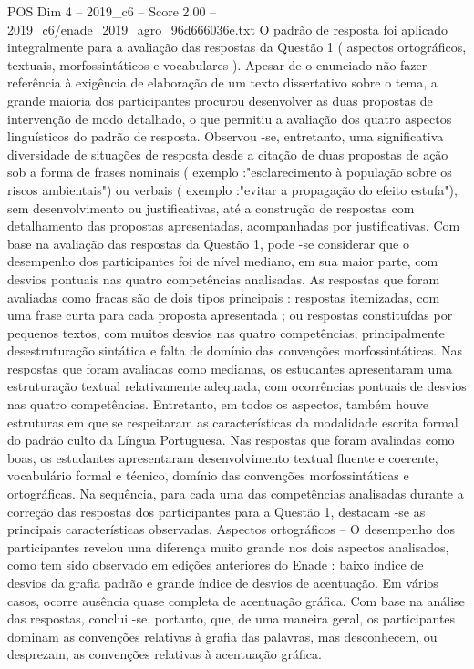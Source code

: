 \begin{textsample}{POS Dim 4 – 2019\_c6 – Score 2.00 – 2019\_c6/enade\_2019\_agro\_96d666036e.txt}
O padrão de resposta foi aplicado integralmente para a avaliação das respostas da Questão 1 ( aspectos ortográficos, textuais, morfossintáticos e vocabulares ).
Apesar de o enunciado não fazer referência à exigência de elaboração de um texto dissertativo sobre o tema, a grande maioria dos participantes procurou desenvolver as duas propostas de intervenção de modo detalhado, o que permitiu a avaliação dos quatro aspectos linguísticos do padrão de resposta.
Observou -se, entretanto, uma significativa diversidade de situações de resposta desde a citação de duas propostas de ação sob a forma de frases nominais ( exemplo :"esclarecimento à população sobre os riscos ambientais") ou verbais ( exemplo :"evitar a propagação do efeito estufa"), sem desenvolvimento ou justificativas, até a construção de respostas com detalhamento das propostas apresentadas, acompanhadas por justificativas.
Com base na avaliação das respostas da Questão 1, pode -se considerar que o desempenho dos participantes foi de nível mediano, em sua maior parte, com desvios pontuais nas quatro competências analisadas.
As respostas que foram avaliadas como fracas são de dois tipos principais : respostas itemizadas, com uma frase curta para cada proposta apresentada ; ou respostas constituídas por pequenos textos, com muitos desvios nas quatro competências, principalmente desestruturação sintática e falta de domínio das convenções morfossintáticas.
Nas respostas que foram avaliadas como medianas, os estudantes apresentaram uma estruturação textual relativamente adequada, com ocorrências pontuais de desvios nas quatro competências.
Entretanto, em todos os aspectos, também houve estruturas em que se respeitaram as características da modalidade escrita formal do padrão culto da Língua Portuguesa.
Nas respostas que foram avaliadas como boas, os estudantes apresentaram desenvolvimento textual fluente e coerente, vocabulário formal e técnico, domínio das convenções morfossintáticas e ortográficas.
Na sequência, para cada uma das competências analisadas durante a correção das respostas dos participantes para a Questão 1, destacam -se as principais características observadas.
Aspectos ortográficos – O desempenho dos participantes revelou uma diferença muito grande nos dois aspectos analisados, como tem sido observado em edições anteriores do Enade : baixo índice de desvios da grafia padrão e grande índice de desvios de acentuação.
Em vários casos, ocorre ausência quase completa de acentuação gráfica.
Com base na análise das respostas, conclui -se, portanto, que, de uma maneira geral, os participantes dominam as convenções relativas à grafia das palavras, mas desconhecem, ou desprezam, as convenções relativas à acentuação gráfica.

\end{textsample}
